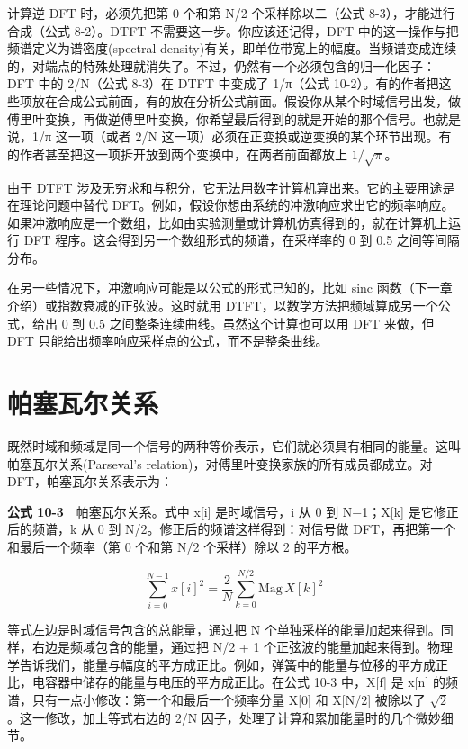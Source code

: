 计算逆 DFT 时，必须先把第 0 个和第 N/2 个采样除以二（公式
8-3），才能进行合成（公式 8-2）。DTFT 不需要这一步。你应该还记得，DFT
中的这一操作与把频谱定义为谱密度(spectral
density)有关，即单位带宽上的幅度。当频谱变成连续的，对端点的特殊处理就消失了。不过，仍然有一个必须包含的归一化因子：DFT
中的 2/N（公式 8-3）在 DTFT 中变成了 1/π（公式
10-2）。有的作者把这些项放在合成公式前面，有的放在分析公式前面。假设你从某个时域信号出发，做傅里叶变换，再做逆傅里叶变换，你希望最后得到的就是开始的那个信号。也就是说，1/π
这一项（或者 2/N
这一项）必须在正变换或逆变换的某个环节出现。有的作者甚至把这一项拆开放到两个变换中，在两者前面都放上
\(1/\sqrt{\pi}\)。

由于 DTFT
涉及无穷求和与积分，它无法用数字计算机算出来。它的主要用途是在理论问题中替代
DFT。例如，假设你想由系统的冲激响应求出它的频率响应。如果冲激响应是一个数组，比如由实验测量或计算机仿真得到的，就在计算机上运行
DFT 程序。这会得到另一个数组形式的频谱，在采样率的 0 到 0.5
之间等间隔分布。

在另一些情况下，冲激响应可能是以公式的形式已知的，比如 sinc
函数（下一章介绍）或指数衰减的正弦波。这时就用
DTFT，以数学方法把频域算成另一个公式，给出 0 到 0.5
之间整条连续曲线。虽然这个计算也可以用 DFT 来做，但 DFT
只能给出频率响应采样点的公式，而不是整条曲线。

\section{帕塞瓦尔关系}

既然时域和频域是同一个信号的两种等价表示，它们就必须具有相同的能量。这叫帕塞瓦尔关系(Parseval's
relation)，对傅里叶变换家族的所有成员都成立。对
DFT，帕塞瓦尔关系表示为：

\textbf{公式 10-3}　帕塞瓦尔关系。式中 x{[}i{]} 是时域信号，i 从 0 到
N−1；X{[}k{]} 是它修正后的频谱，k 从 0 到
N/2。修正后的频谱这样得到：对信号做 DFT，再把第一个和最后一个频率（第 0
个和第 N/2 个采样）除以 2 的平方根。

\[\sum_{i=0}^{N-1} x[i]^2 = \frac{2}{N}\sum_{k=0}^{N/2} \mathrm{Mag}\,X[k]^2\]

等式左边是时域信号包含的总能量，通过把 N
个单独采样的能量加起来得到。同样，右边是频域包含的能量，通过把 N/2 + 1
个正弦波的能量加起来得到。物理学告诉我们，能量与幅度的平方成正比。例如，弹簧中的能量与位移的平方成正比，电容器中储存的能量与电压的平方成正比。在公式
10-3 中，X{[}f{]} 是 x{[}n{]}
的频谱，只有一点小修改：第一个和最后一个频率分量 X{[}0{]} 和 X{[}N/2{]}
被除以了 \(\sqrt{2}\)。这一修改，加上等式右边的 2/N
因子，处理了计算和累加能量时的几个微妙细节。

